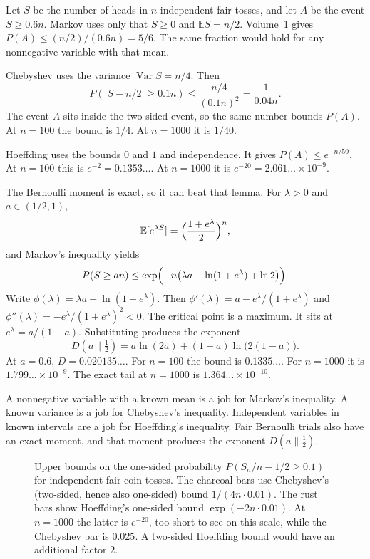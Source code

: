 \begin{examplex}
Let $S$ be the number of heads in $n$ independent fair tosses, and let $A$ be the event $S\ge 0.6n$. Markov uses only that $S\ge0$ and $\mathbb ES=n/2$. Volume~1 gives $P(A)\le(n/2)/(0.6n)=5/6$. The same fraction would hold for any nonnegative variable with that mean.

Chebyshev uses the variance $\operatorname{Var}S=n/4$. Then
\[
 P(|S-n/2|\ge 0.1n)\le\frac{n/4}{(0.1n)^2}=\frac{1}{0.04n}.
\]
The event $A$ sits inside the two-sided event, so the same number bounds $P(A)$. At $n=100$ the bound is $1/4$. At $n=1000$ it is $1/40$.
\end{examplex}

\begin{examplex}
Hoeffding uses the bounds $0$ and $1$ and independence. It gives $P(A)\le e^{-n/50}$. At $n=100$ this is $e^{-2}=0.1353\ldots$. At $n=1000$ it is $e^{-20}=2.061\ldots\times 10^{-9}$.

The Bernoulli moment is exact, so it can beat that lemma. For $\lambda>0$ and $a\in(1/2,1)$,
\[
 \mathbb E[e^{\lambda S}]=\Bigl(\frac{1+e^{\lambda}}{2}\Bigr)^n,
\]
and Markov's inequality yields
\[
 P(S\ge an)\le\exp\Bigl(-n\bigl(\lambda a-\ln(1+e^{\lambda})+\ln 2\bigr)\Bigr).
\]
Write $\phi(\lambda)=\lambda a-\ln(1+e^{\lambda})$. Then $\phi'(\lambda)=a-e^{\lambda}/(1+e^{\lambda})$ and $\phi''(\lambda)=-e^{\lambda}/(1+e^{\lambda})^2<0$. The critical point is a maximum. It sits at $e^{\lambda}=a/(1-a)$. Substituting produces the exponent
\[
 D(a\|\tfrac12)=a\ln(2a)+(1-a)\ln\bigl(2(1-a)\bigr).
\]
At $a=0.6$, $D=0.020135\ldots$. For $n=100$ the bound is $0.1335\ldots$. For $n=1000$ it is $1.799\ldots\times 10^{-9}$. The exact tail at $n=1000$ is $1.364\ldots\times 10^{-10}$.

A nonnegative variable with a known mean is a job for Markov's inequality. A known variance is a job for Chebyshev's inequality. Independent variables in known intervals are a job for Hoeffding's inequality. Fair Bernoulli trials also have an exact moment, and that moment produces the exponent $D(a\|\tfrac12)$.
\end{examplex}

\begin{figure}[ht]
\centering
{}
\caption{Upper bounds on the one-sided probability $P(S_n/n-1/2\ge 0.1)$ for independent fair coin tosses. The charcoal bars use Chebyshev's (two-sided, hence also one-sided) bound $1/(4n\cdot0.01)$. The rust bars show Hoeffding's one-sided bound $\exp(-2n\cdot0.01)$. At $n=1000$ the latter is $e^{-20}$, too short to see on this scale, while the Chebyshev bar is $0.025$. A two-sided Hoeffding bound would have an additional factor $2$.}
\label{fig:chernoff}
\end{figure}

